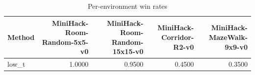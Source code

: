 \begin{table}[htbp]
\centering
\caption{Per-environment win rates}
\label{tab:per-env}
\begin{tabular}{lrrrr}
\toprule
\textbf{Method} & \textbf{MiniHack-Room-Random-5x5-v0} & \textbf{MiniHack-Room-Random-15x15-v0} & \textbf{MiniHack-Corridor-R2-v0} & \textbf{MiniHack-MazeWalk-9x9-v0} \\
\midrule
low\_t & 1.0000 & 0.9500 & 0.4500 & 0.3500 \\
\bottomrule
\end{tabular}
\end{table}